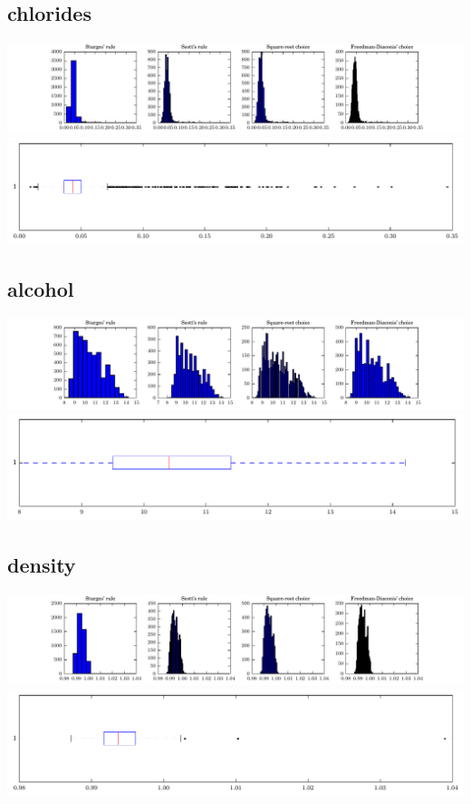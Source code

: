 \documentclass{report}
\begin{document}
\subsection{chlorides}
\includegraphics{histograms/chlorides.pdf}
\includegraphics{boxplots/chlorides.pdf}
\subsection{alcohol}
\includegraphics{histograms/alcohol.pdf}
\includegraphics{boxplots/alcohol.pdf}
\subsection{density}
\includegraphics{histograms/density.pdf}
\includegraphics{boxplots/density.pdf}
\end{document}
